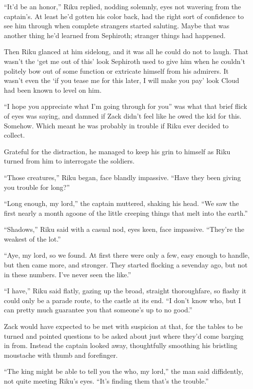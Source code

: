 ``It'd be an honor,'' Riku replied, nodding solemnly, eyes not wavering from the captain's. At least he'd gotten his color back, had the right sort of confidence to see him through when complete strangers started saluting. Maybe that was another thing he'd learned from Sephiroth; stranger things had happened.

Then Riku glanced at him sidelong, and it was all he could do not to laugh. That wasn't the `get me out of this' look Sephiroth used to give him when he couldn't politely bow out of some function or extricate himself from his admirers. It wasn't even the `if you tease me for this later, I will make you pay' look Cloud had been known to level on him.

``I hope you appreciate what I'm going through for you'' was what that brief flick of eyes was saying, and damned if Zack didn't feel like he owed the kid for this. Somehow. Which meant he was probably in trouble if Riku ever decided to collect.

Grateful for the distraction, he managed to keep his grin to himself as Riku turned from him to interrogate the soldiers.

``Those creatures,'' Riku began, face blandly impassive. ``Have they been giving you trouble for long?''

``Long enough, my lord,'' the captain muttered, shaking his head. ``We saw the first nearly a month ago\textemdash one of the little creeping things that melt into the earth.''

``Shadows,'' Riku said with a casual nod, eyes keen, face impassive. ``They're the weakest of the lot.''

``Aye, my lord, so we found. At first there were only a few, easy enough to handle, but then came more, and stronger. They started flocking a sevenday ago, but not in these numbers. I've never seen the like.''

``I have,'' Riku said flatly, gazing up the broad, straight thoroughfare, so flashy it could only be a parade route, to the castle at its end. ``I don't know who, but I can pretty much guarantee you that someone's up to no good.''

Zack would have expected to be met with suspicion at that, for the tables to be turned and pointed questions to be asked about just where they'd come barging in from. Instead the captain looked away, thoughtfully smoothing his bristling moustache with thumb and forefinger.

``The king might be able to tell you the who, my lord,'' the man said diffidently, not quite meeting Riku's eyes. ``It's finding them that's the trouble.''

